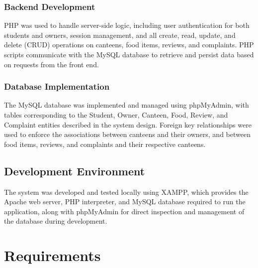\documentclass[ 12pt,a4paper,twocolumn,fleqn]{article}
\begin{document}
\subsubsection{Backend Development}
PHP was used to handle server-side logic, including user authentication for both students and owners, session management, and all create, read, update, and delete (CRUD) operations on canteens, food items, reviews, and complaints. PHP scripts communicate with the MySQL database to retrieve and persist data based on requests from the front end.

\subsubsection{Database Implementation}
The MySQL database was implemented and managed using phpMyAdmin, with tables corresponding to the Student, Owner, Canteen, Food, Review, and Complaint entities described in the system design. Foreign key relationships were used to enforce the associations between canteens and their owners, and between food items, reviews, and complaints and their respective canteens.

\subsection{Development Environment}
The system was developed and tested locally using XAMPP, which provides the Apache web server, PHP interpreter, and MySQL database required to run the application, along with phpMyAdmin for direct inspection and management of the database during development.

\section{Requirements}
\end{document}
